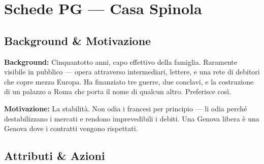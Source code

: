 \chapter{Schede PG — Casa Spinola}



\section*{Background \& Motivazione}
\begin{rulebox}{}
\textbf{Background:} Cinquantotto anni, capo effettivo della famiglia. Raramente visibile in pubblico — opera attraverso intermediari, lettere, e una rete di debitori che copre mezza Europa. Ha finanziato tre guerre, due conclavi, e la costruzione di un palazzo a Roma che porta il nome di qualcun altro. Preferisce così.

\medskip\noindent\textcolor{SpinolaRed}{\textbf{Motivazione:}} La stabilità. Non odia i francesi per principio — li odia perché destabilizzano i mercati e rendono imprevedibili i debiti. Una Genova libera è una Genova dove i contratti vengono rispettati.
\end{rulebox}

\section*{Attributi \& Azioni}

